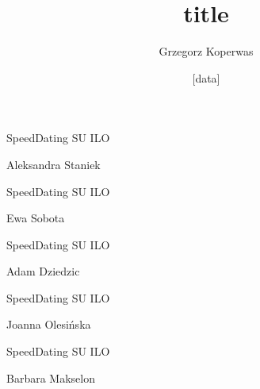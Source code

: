 \documentclass[a4paper,12pt]{article}
\title{title}
\author{Grzegorz Koperwas}
\date{[data]}
\begin{document}
\begin{minipage}[c]{\textwidth}
  \hline

  \hspace{0.5cm}

  SpeedDating SU ILO

  Aleksandra Staniek

  \hspace{0.5cm}

  \hline
\end{minipage}



\begin{minipage}[c]{\textwidth}
  \hline

  \hspace{0.5cm}

  SpeedDating SU ILO

  Ewa Sobota

  \hspace{0.5cm}

  \hline
\end{minipage}



\begin{minipage}[c]{\textwidth}
  \hline

  \hspace{0.5cm}

  SpeedDating SU ILO

  Adam Dziedzic

  \hspace{0.5cm}

  \hline
\end{minipage}



\begin{minipage}[c]{\textwidth}
  \hline

  \hspace{0.5cm}

  SpeedDating SU ILO

  Joanna Olesińska

  \hspace{0.5cm}

  \hline
\end{minipage}



\begin{minipage}[c]{\textwidth}
  \hline

  \hspace{0.5cm}

  SpeedDating SU ILO

  Barbara Makselon

  \hspace{0.5cm}

  \hline
\end{minipage}
\end{document}
